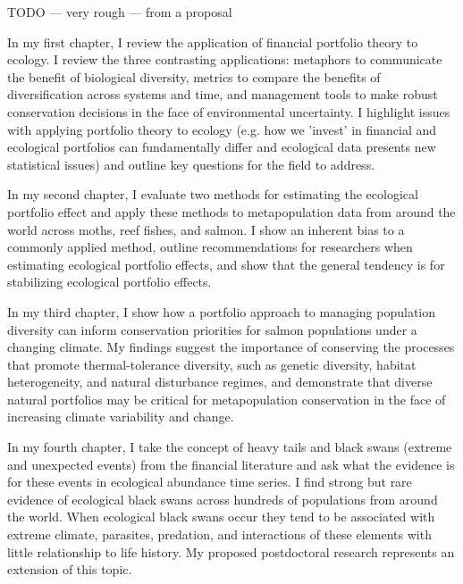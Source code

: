 
%
%


TODO --- very rough --- from a proposal


In my first chapter, I review the application of financial portfolio theory to
ecology. I review the three contrasting applications: metaphors to communicate
the benefit of biological diversity, metrics to compare the benefits of
diversification across systems and time, and management tools to make robust
conservation decisions in the face of environmental uncertainty. I highlight
issues with applying portfolio theory to ecology (e.g. how we 'invest' in
financial and ecological portfolios can fundamentally differ and ecological
data presents new statistical issues) and outline key questions for the field
to address.

In my second chapter, I evaluate two methods for estimating the ecological
portfolio effect and apply these methods to metapopulation data from around the
world across moths, reef fishes, and salmon. I show an inherent bias to a
commonly applied method, outline recommendations for researchers when
estimating ecological portfolio effects, and show that the general tendency is
for stabilizing ecological portfolio effects.

In my third chapter, I show how a portfolio approach to managing population
diversity can inform conservation priorities for salmon populations under a
changing climate. My findings suggest the importance of conserving the
processes that promote thermal-tolerance diversity, such as genetic diversity,
habitat heterogeneity, and natural disturbance regimes, and demonstrate that
diverse natural portfolios may be critical for metapopulation conservation in
the face of increasing climate variability and change.

In my fourth chapter, I take the concept of heavy tails and black swans
(extreme and unexpected events) from the financial literature and ask what the
evidence is for these events in ecological abundance time series. I find strong
but rare evidence of ecological black swans across hundreds of populations from
around the world. When ecological black swans occur they tend to be associated
with extreme climate, parasites, predation, and interactions of these elements
with little relationship to life history. My proposed postdoctoral research
represents an extension of this topic.














